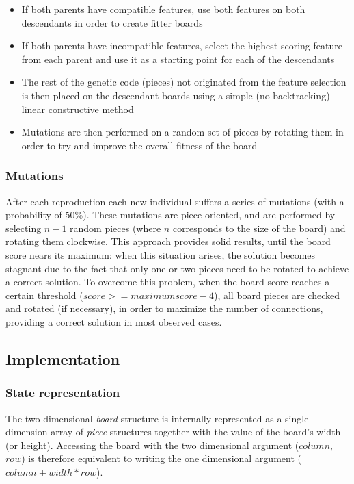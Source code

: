 \documentclass{llncs}
\begin{document}
\begin{itemize}
  \item If both parents have compatible features, use both features on both descendants in order to create fitter boards
  \item If both parents have incompatible features, select the highest scoring feature from each parent and use it as a starting point for each of the descendants
  \item The rest of the genetic code (pieces) not originated from the feature selection is then placed on the descendant boards using a simple (no backtracking) linear constructive method
  \item Mutations are then performed on a random set of pieces by rotating them in order to try and improve the overall fitness of the board
\end{itemize}

\subsubsection{Mutations}\label{sec:mutations}

After each reproduction each new individual suffers a series of mutations (with a probability of 50\%). These mutations are piece-oriented, and are performed by selecting $n-1$ random pieces (where $n$ corresponds to the size of the board) and rotating them clockwise. This approach provides solid results, until the board score nears its maximum: when this situation arises, the solution becomes stagnant due to the fact that only one or two pieces need to be rotated to achieve a correct solution. To overcome this problem, when the board score reaches a certain threshold ($score >= maximum score - 4$), all board pieces are checked and rotated (if necessary), in order to maximize the number of connections, providing a correct solution in most observed cases.

\subsection{Implementation}\label{sec:implementation}

\subsubsection{State representation}\label{sec:state_representation}

The two dimensional \textit{board} structure is internally represented as a single dimension array of \textit{piece} structures together with the value of the board's width (or height). Accessing the board with the two dimensional argument ($column$, $row$) is therefore equivalent to writing the one dimensional argument ($column + width * row$).
\end{document}

